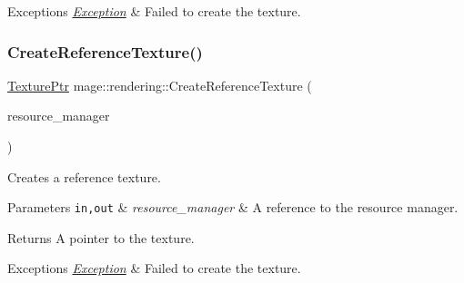 \begin{DoxyExceptions}{Exceptions}
{\em \mbox{\hyperlink{classmage_1_1_exception}{Exception}}} & Failed to create the texture. \\
\hline
\end{DoxyExceptions}
\mbox{\label{namespacemage_1_1rendering_a0f660325d9c268b8e57f680a1d0e24ac}} 
\subsubsection{\texorpdfstring{Create\+Reference\+Texture()}{CreateReferenceTexture()}}
{\footnotesize\ttfamily \mbox{\hyperlink{namespacemage_1_1rendering_a6f3ae54f825328465b0cdde0f0de4a36}{Texture\+Ptr}} mage\+::rendering\+::\+Create\+Reference\+Texture (\begin{DoxyParamCaption}\item[{\mbox{\hyperlink{classmage_1_1rendering_1_1_resource_manager}{Resource\+Manager}} \&}]{resource\+\_\+manager }\end{DoxyParamCaption})}

Creates a reference texture.


\begin{DoxyParams}[1]{Parameters}
\mbox{\tt in,out}  & {\em resource\+\_\+manager} & A reference to the resource manager. \\
\hline
\end{DoxyParams}
\begin{DoxyReturn}{Returns}
A pointer to the texture. 
\end{DoxyReturn}

\begin{DoxyExceptions}{Exceptions}
{\em \mbox{\hyperlink{classmage_1_1_exception}{Exception}}} & Failed to create the texture. \\
\hline
\end{DoxyExceptions}
\mbox{\label{namespacemage_1_1rendering_a7a0e0bcbedbc964d2ce28e1860b24158}} 
